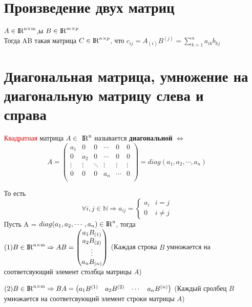 \documentclass[a4paper,11pt]{report}
\DeclareMathOperator{\real}{\rm I\!R}
\DeclareMathOperator{\Mnm}{\real^{n\times m}}
\DeclareMathOperator{\Mn}{{\rm I\!R}^{n}}
\begin{document}
\section{Произведение двух матриц}
$A \in \Mnm $,ы
$B \in \real^{m\times p}$\\
Тогда AB \textendash такая матрица $C \in \real^{n\times p}$, что $c_{ij} = A_{(i)}B^{(j)} = \sum_{k=1}^{n} a_{ik}b_{kj}$
\section{Диагональная матрица, умножение на диагональную матрицу слева и справа}
\textcolor{red}{Квадратная} матрица $A \in$ \textcolor{red}{$\Mn$} называется \textbf{диагональной} $\Leftrightarrow$
\[
A = 
\begin{pmatrix}
a_1 & 0 & 0 & \cdots & 0 & 0\\
0 & a_2 & 0 & \cdots & 0 & 0\\
\vdots & \vdots & \ddots & \vdots & \vdots & \vdots\\
0 & 0 & 0 & a_n & \cdots & 0\\
\end{pmatrix}
= diag(a_1, a_2,\cdots, a_n)
\]

То есть
\[
\forall i, j \in \mathbb{N} \Rightarrow a_{ij} = 
\begin{cases}
  a_i & i = j\\
  0 & i \neq j
\end{cases}
\] 
\newline
\newline
Пусть A = $diag(a_1, a_2, \cdots, a_n) \in \Mn $, тогда \\

$
(1) B \in \Mnm \Rightarrow AB = 
\begin{pmatrix}
a_1{B_{(1)}}\\
a_2{B_{(2)}}\\
\vdots\\
a_n{B_{(n)}}\\
\end{pmatrix}
$ (Каждая строка $B$ умножается на соответсвующий элемент столбца матрицы $A$)

$
(2) B \in \Mnm \Rightarrow BA = 
\begin{pmatrix}
a_1{B^{(1)}} & a_2{B^{(2)}} & \cdots & a_n{B^{(n)}}\\
\end{pmatrix}
$ (Каждый сролбец $B$ умножается на соответсвующий элемент строки матрицы $A$)\\
\end{document}
